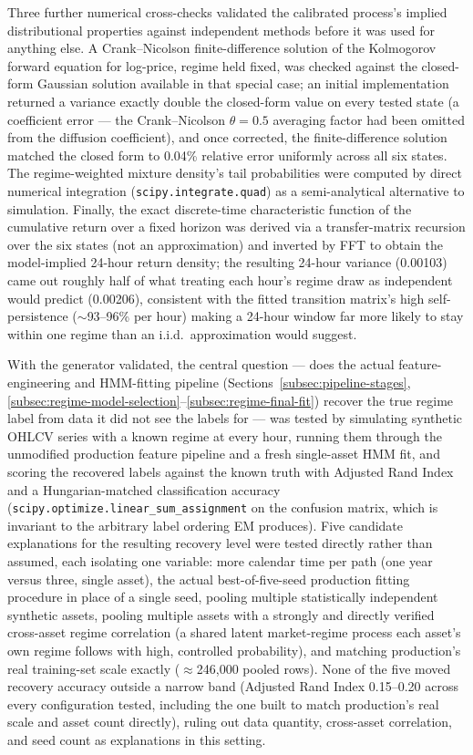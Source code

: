Three further numerical cross-checks validated the calibrated process's implied distributional properties against independent methods before it was used for anything else. A Crank--Nicolson finite-difference solution of the Kolmogorov forward equation for log-price, regime held fixed, was checked against the closed-form Gaussian solution available in that special case; an initial implementation returned a variance exactly double the closed-form value on every tested state (a coefficient error --- the Crank--Nicolson $\theta=0.5$ averaging factor had been omitted from the diffusion coefficient), and once corrected, the finite-difference solution matched the closed form to 0.04\% relative error uniformly across all six states. The regime-weighted mixture density's tail probabilities were computed by direct numerical integration (\texttt{scipy.integrate.quad}) as a semi-analytical alternative to simulation. Finally, the exact discrete-time characteristic function of the cumulative return over a fixed horizon was derived via a transfer-matrix recursion over the six states (not an approximation) and inverted by FFT to obtain the model-implied 24-hour return density; the resulting 24-hour variance (0.00103) came out roughly half of what treating each hour's regime draw as independent would predict (0.00206), consistent with the fitted transition matrix's high self-persistence ($\sim$93--96\% per hour) making a 24-hour window far more likely to stay within one regime than an i.i.d.\ approximation would suggest.

With the generator validated, the central question --- does the actual feature-engineering and HMM-fitting pipeline (Sections~\ref{subsec:pipeline-stages}, \ref{subsec:regime-model-selection}--\ref{subsec:regime-final-fit}) recover the true regime label from data it did not see the labels for --- was tested by simulating synthetic OHLCV series with a known regime at every hour, running them through the unmodified production feature pipeline and a fresh single-asset HMM fit, and scoring the recovered labels against the known truth with Adjusted Rand Index and a Hungarian-matched classification accuracy (\texttt{scipy.optimize.linear\_sum\_assignment} on the confusion matrix, which is invariant to the arbitrary label ordering EM produces). Five candidate explanations for the resulting recovery level were tested directly rather than assumed, each isolating one variable: more calendar time per path (one year versus three, single asset), the actual best-of-five-seed production fitting procedure in place of a single seed, pooling multiple statistically independent synthetic assets, pooling multiple assets with a strongly and directly verified cross-asset regime correlation (a shared latent market-regime process each asset's own regime follows with high, controlled probability), and matching production's real training-set scale exactly ($\approx$246{,}000 pooled rows). None of the five moved recovery accuracy outside a narrow band (Adjusted Rand Index 0.15--0.20 across every configuration tested, including the one built to match production's real scale and asset count directly), ruling out data quantity, cross-asset correlation, and seed count as explanations in this setting.

